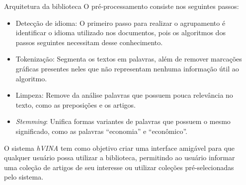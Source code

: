 \documentclass[final]{beamer}
\newlength{\sepwid}
\newlength{\onecolwid}
\newlength{\twocolwid}
\begin{document}
\begin{frame}[t]
\begin{columns}[t]
\begin{column}{\twocolwid}
\begin{columns}[t,totalwidth=\twocolwid]
\begin{column}{\onecolwid}
\begin{block}{Arquitetura da biblioteca}
O pré-processamento consiste nos seguintes passos:

\begin{itemize}
\item Detecção de idioma: O primeiro passo para realizar o agrupamento é identificar o idioma utilizado nos documentos, pois os algoritmos dos passos seguintes necessitam desse conhecimento. %
\item Tokenização: Segmenta os textos em palavras, além de remover marcações gráficas presentes neles que não representam nenhuma informação útil ao algoritmo.
\item Limpeza: Remove da análise palavras que possuem pouca relevância no texto, como as preposições e os artigos.
\item \textit{Stemming}: Unifica formas variantes de palavras que possuem o mesmo significado, como as palavras ``economia'' e ``econômico''.
\end{itemize}





O sistema \textit{hVINA} tem como objetivo criar uma interface amigável para que qualquer usuário possa utilizar a biblioteca, permitindo ao usuário informar uma coleção de artigos de seu interesse ou utilizar coleções pré-selecionadas pelo sistema.


\end{block}


\end{column} %

\end{columns} %

\end{column} %

\begin{column}{\sepwid}\end{column} %


\end{columns}
\end{frame}
\end{document}
